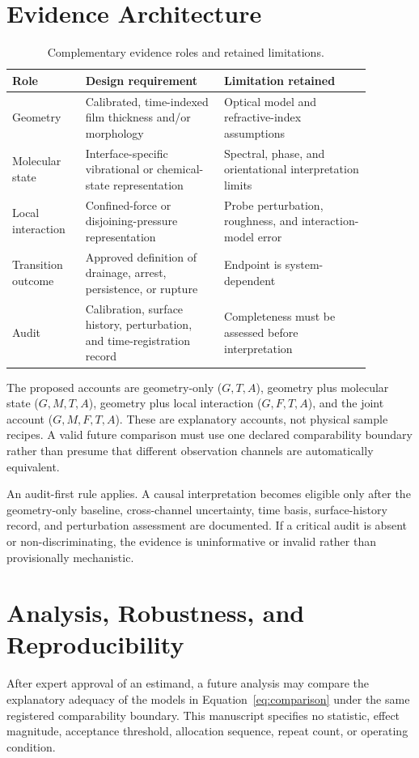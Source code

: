 \documentclass[11pt]{article}
\begin{document}
\section{Evidence Architecture}
\begin{table}[htbp]
\centering
\caption{Complementary evidence roles and retained limitations.}
\label{tab:evidence}
\begin{tabular}{p{0.18\linewidth}p{0.34\linewidth}p{0.36\linewidth}}
\toprule
Role & Design requirement & Limitation retained \\
\midrule
Geometry & Calibrated, time-indexed film thickness and/or morphology & Optical model and refractive-index assumptions \\
Molecular state & Interface-specific vibrational or chemical-state representation & Spectral, phase, and orientational interpretation limits \\
Local interaction & Confined-force or disjoining-pressure representation & Probe perturbation, roughness, and interaction-model error \\
Transition outcome & Approved definition of drainage, arrest, persistence, or rupture & Endpoint is system-dependent \\
Audit & Calibration, surface history, perturbation, and time-registration record & Completeness must be assessed before interpretation \\
\bottomrule
\end{tabular}
\end{table}

The proposed accounts are geometry-only ($G,T,A$), geometry plus molecular state ($G,M,T,A$), geometry plus local interaction ($G,F,T,A$), and the joint account ($G,M,F,T,A$). These are explanatory accounts, not physical sample recipes. A valid future comparison must use one declared comparability boundary rather than presume that different observation channels are automatically equivalent.

An audit-first rule applies. A causal interpretation becomes eligible only after the geometry-only baseline, cross-channel uncertainty, time basis, surface-history record, and perturbation assessment are documented. If a critical audit is absent or non-discriminating, the evidence is uninformative or invalid rather than provisionally mechanistic.

\section{Analysis, Robustness, and Reproducibility}
After expert approval of an estimand, a future analysis may compare the explanatory adequacy of the models in Equation~\eqref{eq:comparison} under the same registered comparability boundary. This manuscript specifies no statistic, effect magnitude, acceptance threshold, allocation sequence, repeat count, or operating condition.
\end{document}
